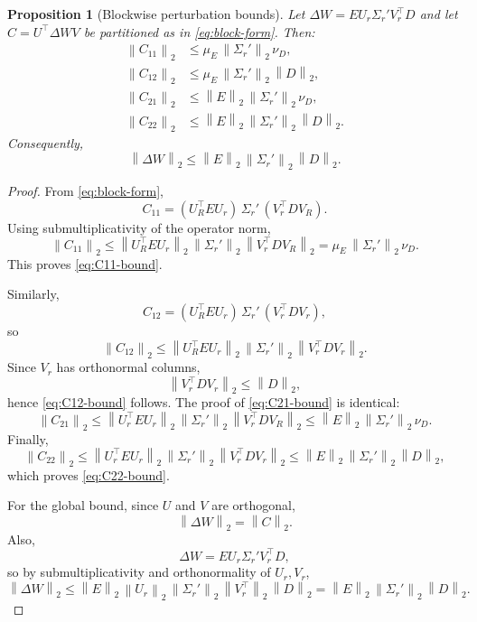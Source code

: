 \documentclass[11pt]{article}
\newtheorem{proposition}{Proposition}
\newcommand{\op}[1]{\left\|#1\right\|_2}
\begin{document}
\begin{proposition}[Blockwise perturbation bounds]
\label{prop:block-bounds}
Let \(\Delta W = E U_r \Sigma_r' V_r^\top D\) and let \(C = U^\top \Delta W V\) be partitioned as in \eqref{eq:block-form}. Then:
\begin{align}
\op{C_{11}}
&\le
\mu_E\, \op{\Sigma_r'}\, \nu_D,
\label{eq:C11-bound}
\\
\op{C_{12}}
&\le
\mu_E\, \op{\Sigma_r'}\, \op{D},
\label{eq:C12-bound}
\\
\op{C_{21}}
&\le
\op{E}\, \op{\Sigma_r'}\, \nu_D,
\label{eq:C21-bound}
\\
\op{C_{22}}
&\le
\op{E}\, \op{\Sigma_r'}\, \op{D}.
\label{eq:C22-bound}
\end{align}
Consequently,
\begin{equation}
\label{eq:global-perturb-bound}
\op{\Delta W}
\le
\op{E}\,\op{\Sigma_r'}\,\op{D}.
\end{equation}
\end{proposition}

\begin{proof}
From \eqref{eq:block-form},
\[
C_{11}
=
(U_R^\top E U_r)\,\Sigma_r'\,(V_r^\top D V_R).
\]
Using submultiplicativity of the operator norm,
\[
\op{C_{11}}
\le
\op{U_R^\top E U_r}\,\op{\Sigma_r'}\,\op{V_r^\top D V_R}
=
\mu_E\,\op{\Sigma_r'}\,\nu_D.
\]
This proves \eqref{eq:C11-bound}.

Similarly,
\[
C_{12}
=
(U_R^\top E U_r)\,\Sigma_r'\,(V_r^\top D V_r),
\]
so
\[
\op{C_{12}}
\le
\op{U_R^\top E U_r}\,\op{\Sigma_r'}\,\op{V_r^\top D V_r}.
\]
Since \(V_r\) has orthonormal columns,
\[
\op{V_r^\top D V_r}\le \op{D},
\]
hence \eqref{eq:C12-bound} follows. The proof of \eqref{eq:C21-bound} is identical:
\[
\op{C_{21}}
\le
\op{U_r^\top E U_r}\,\op{\Sigma_r'}\,\op{V_r^\top D V_R}
\le
\op{E}\,\op{\Sigma_r'}\,\nu_D.
\]
Finally,
\[
\op{C_{22}}
\le
\op{U_r^\top E U_r}\,\op{\Sigma_r'}\,\op{V_r^\top D V_r}
\le
\op{E}\,\op{\Sigma_r'}\,\op{D},
\]
which proves \eqref{eq:C22-bound}.

For the global bound, since \(U\) and \(V\) are orthogonal,
\[
\op{\Delta W}=\op{C}.
\]
Also,
\[
\Delta W = E U_r \Sigma_r' V_r^\top D,
\]
so by submultiplicativity and orthonormality of \(U_r,V_r\),
\[
\op{\Delta W}
\le
\op{E}\,\op{U_r}\,\op{\Sigma_r'}\,\op{V_r^\top}\,\op{D}
=
\op{E}\,\op{\Sigma_r'}\,\op{D}.
\]
\end{proof}
\end{document}
